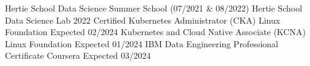 

\begin{cvhonors}
  \cvhonor
    {Hertie School Data Science Summer School (07/2021 \& 08/2022)} %
    {Hertie School Data Science Lab} %
    {} %
    {2022} %
  \cvhonor
    {Certified Kubernetes Administrator (CKA)} %
    {Linux Foundation} %
    {} %
    {Expected 02/2024} %
  \cvhonor
    {Kubernetes and Cloud Native Associate (KCNA)} %
    {Linux Foundation} %
    {} %
    {Expected 01/2024} %
  \cvhonor
    {IBM Data Engineering Professional Certificate} %
    {Coursera} %
    {} %
    {Expected 03/2024} %
\end{cvhonors}
